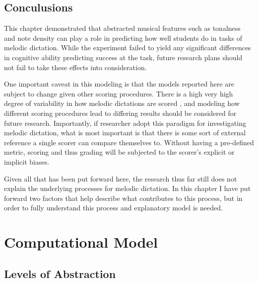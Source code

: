 \documentclass[]{book}
\begin{document}
\hypertarget{conculusions}{%
\section{Conculusions}\label{conculusions}}

This chapter demonstrated that abstracted musical features such as tonalness and note density can play a role in predicting how well students do in tasks of melodic dictation.
While the experiment failed to yield any significant differences in cognitive ability predicting success at the task, future research plans should not fail to take these effects into consideration.

One important caveat in this modeling is that the models reported here are subject to change given other scoring procedures.
There is a high very high degree of variability in how melodic dictations are scored \citep{gillespieMelodicDictationScoring2001}, and modeling how different scoring procedures lead to differing results should be considered for future research.
Importantly, if researcher adopt this paradigm for investigating melodic dictation, what is most important is that there is some sort of external reference a single scorer can compare themselves to.
Without having a pre-defined metric, scoring and thus grading will be subjected to the scorer's explicit or implicit biases.

Given all that has been put forward here, the research thus far still does not explain the underlying processes for melodic dictation.
In this chapter I have put forward two factors that help describe what contributes to this process, but in order to fully understand this process and explanatory model is needed.

\hypertarget{computational-model}{%
\chapter{Computational Model}\label{computational-model}}

\hypertarget{levels-of-abstraction}{%
\section{Levels of Abstraction}\label{levels-of-abstraction}}
\end{document}

